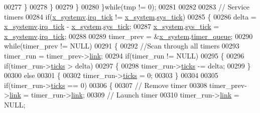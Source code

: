 \begin{DoxyCode}
00277                 \}
00278             \}
00279         \}
00280     \}\textcolor{keywordflow}{while}(tmp != 0);
00281 
00282 
00283     \textcolor{comment}{// Service timers}
00284     \textcolor{keywordflow}{if}(\hyperlink{a00037_ad839c033d3d00cdcc6032038182be270}{x\_systemv}.\hyperlink{a00037_ab73fa103937ad39e7e2fc55783c4c370}{irq\_tick} != \hyperlink{a00037_ae4d7967b507ca26e3ee1231215b03321}{x\_system}.\hyperlink{a00037_aab260797348ca628ed4820714e229a74}{sys\_tick})
00285     \{
00286         delta =  \hyperlink{a00037_ad839c033d3d00cdcc6032038182be270}{x\_systemv}.\hyperlink{a00037_ab73fa103937ad39e7e2fc55783c4c370}{irq\_tick} - \hyperlink{a00037_ae4d7967b507ca26e3ee1231215b03321}{x\_system}.\hyperlink{a00037_aab260797348ca628ed4820714e229a74}{sys\_tick};
00287         \hyperlink{a00037_ae4d7967b507ca26e3ee1231215b03321}{x\_system}.\hyperlink{a00037_aab260797348ca628ed4820714e229a74}{sys\_tick} = \hyperlink{a00037_ad839c033d3d00cdcc6032038182be270}{x\_systemv}.\hyperlink{a00037_ab73fa103937ad39e7e2fc55783c4c370}{irq\_tick};
00288 
00289         timer\_prev = &\hyperlink{a00037_ae4d7967b507ca26e3ee1231215b03321}{x\_system}.\hyperlink{a00037_a10669284e4e6a0d578a68a0b5fbe0d5b}{timer\_queue};
00290         \textcolor{keywordflow}{while}(timer\_prev != NULL)
00291         \{
00292             \textcolor{comment}{//Scan through all timers}
00293             timer\_run  = timer\_prev->\hyperlink{a00036_ac1b431c0d2de68ce090f223b32f212b5}{link};
00294             \textcolor{keywordflow}{if}(timer\_run != NULL)
00295             \{
00296                 \textcolor{keywordflow}{if}(timer\_run->\hyperlink{a00036_aca39a8370fadb7fdd20300deef646d8b}{ticks} > delta)
00297                 \{
00298                     timer\_run->\hyperlink{a00036_aca39a8370fadb7fdd20300deef646d8b}{ticks} -= delta;
00299                 \}
00300                 \textcolor{keywordflow}{else}
00301                 \{
00302                     timer\_run->\hyperlink{a00036_aca39a8370fadb7fdd20300deef646d8b}{ticks} = 0;
00303                 \}
00304 
00305                 \textcolor{keywordflow}{if}(timer\_run->\hyperlink{a00036_aca39a8370fadb7fdd20300deef646d8b}{ticks} == 0)
00306                 \{
00307                     \textcolor{comment}{// Remove timer}
00308                     timer\_prev->\hyperlink{a00036_ac1b431c0d2de68ce090f223b32f212b5}{link} = timer\_run->\hyperlink{a00036_ac1b431c0d2de68ce090f223b32f212b5}{link};
00309                     \textcolor{comment}{// Launch timer}
00310                     timer\_run->\hyperlink{a00036_ac1b431c0d2de68ce090f223b32f212b5}{link}   = NULL;

\end{DoxyCode}
